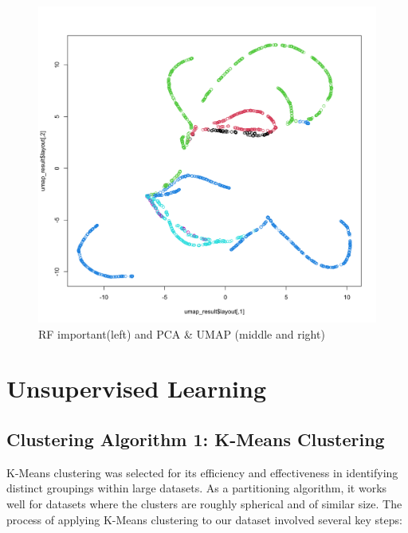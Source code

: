\documentclass[8pt]{report}
\begin{document}
\begin{figure}[H]
    \includegraphics*[scale=0.07]{figures/UMAP_PAC2.png}
    \caption{RF important(left) and PCA \& UMAP (middle and right)}
    \label{fig:RF_PCA_and_UMAP}
\end{figure}


\section{Unsupervised Learning}

\subsection{Clustering Algorithm 1: K-Means Clustering}
K-Means clustering was selected for its efficiency and effectiveness in identifying distinct groupings within large datasets. As a partitioning algorithm, it works well for datasets where the clusters are roughly spherical and of similar size. 
The process of applying K-Means clustering to our dataset involved several key steps:
\end{document}
